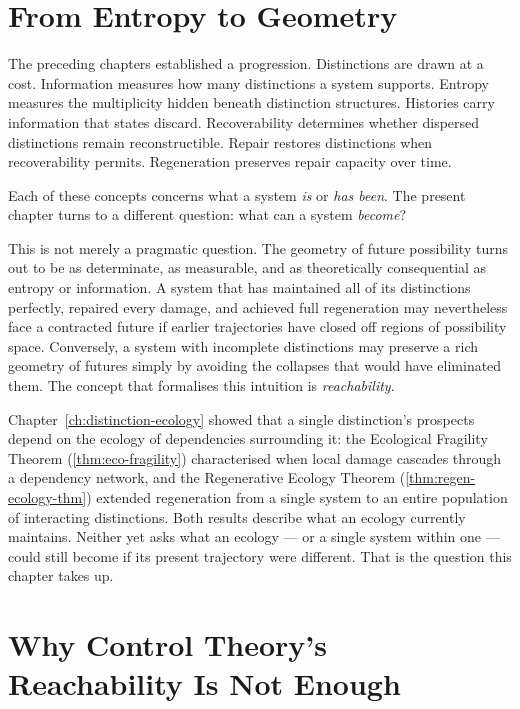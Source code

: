 \documentclass[12pt,twoside,openright]{book}
\begin{document}
\section{From Entropy to Geometry}
\label{sec:ch13-motivation}

The preceding chapters established a progression.
Distinctions are drawn at a cost. Information measures how
many distinctions a system supports. Entropy measures the
multiplicity hidden beneath distinction structures.
Histories carry information that states discard.
Recoverability determines whether dispersed distinctions
remain reconstructible. Repair restores distinctions when
recoverability permits. Regeneration preserves repair
capacity over time.

Each of these concepts concerns what a system \emph{is} or
\emph{has been}. The present chapter turns to a different
question: what can a system \emph{become}?

This is not merely a pragmatic question. The geometry of
future possibility turns out to be as determinate, as
measurable, and as theoretically consequential as entropy
or information. A system that has maintained all of its
distinctions perfectly, repaired every damage, and achieved
full regeneration may nevertheless face a contracted future
if earlier trajectories have closed off regions of
possibility space. Conversely, a system with incomplete
distinctions may preserve a rich geometry of futures simply
by avoiding the collapses that would have eliminated them.
The concept that formalises this intuition is
\emph{reachability}.

Chapter~\ref{ch:distinction-ecology} showed that a single
distinction's prospects depend on the ecology of dependencies
surrounding it: the Ecological Fragility Theorem
(\cref{thm:eco-fragility}) characterised when local damage
cascades through a dependency network, and the Regenerative
Ecology Theorem (\cref{thm:regen-ecology-thm}) extended
regeneration from a single system to an entire population of
interacting distinctions. Both results describe what an
ecology currently maintains. Neither yet asks what an ecology
--- or a single system within one --- could still become if
its present trajectory were different. That is the question
this chapter takes up.

\section{Why Control Theory's Reachability Is Not Enough}
\label{sec:ch13-why-control-theory}
\end{document}
